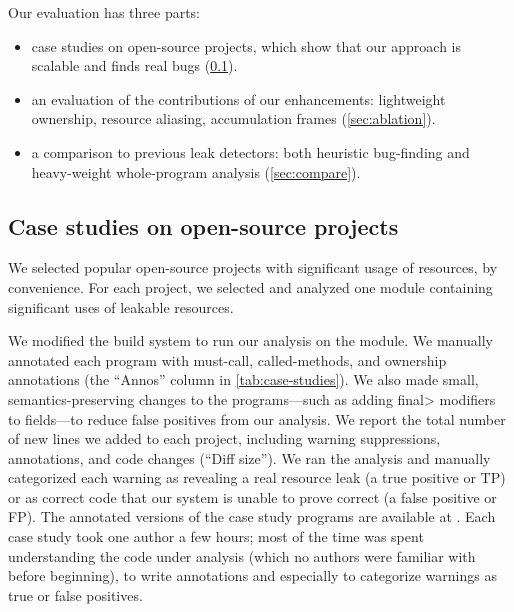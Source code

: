 Our evaluation has three parts:
\begin{itemize}
\item case studies on open-source projects, which show that our approach
  is scalable and finds real bugs (\cref{sec:case-studies}).
\item an evaluation of the contributions of our enhancements:
  lightweight ownership, %
  resource aliasing, %
  accumulation frames %
  (\cref{sec:ablation}).
\item a comparison to previous leak detectors:  both heuristic bug-finding
  and heavy-weight whole-program
  analysis (\cref{sec:compare}).
\end{itemize}

\subsection{Case studies on open-source projects}
\label{sec:case-studies}

We selected  popular open-source projects with significant
usage of resources, by
convenience.
For each project, we selected and analyzed one module
containing significant uses of leakable resources.

We modified the
build system to run our analysis on the module. We manually
annotated each program with must-call, called-methods, and ownership
annotations (the ``Annos'' column in \cref{tab:case-studies}). We also
made small, semantics-preserving changes to the programs---such as adding
\<final> modifiers to fields---to reduce
false positives from our analysis. We report the total number
of new lines we added to each project, including warning suppressions,
annotations, and code changes (``Diff size'').
We ran the analysis and manually categorized each warning as revealing a
real resource leak (a true positive or TP) or as correct code that our
system is unable to prove correct (a false positive or FP\@).
The
annotated versions of the case study programs are available at
.
Each case
study took one author a few hours; most of the time was spent
understanding the code under analysis (which no authors were familiar
with before beginning), to write annotations and especially to categorize
warnings as true or false positives.


